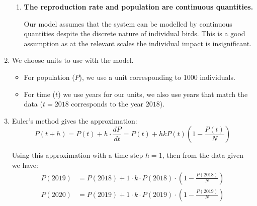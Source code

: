 \documentclass[a4paper, 11pt]{article}
\begin{document}
\begin{enumerate}[label=(\alph*)]
\begin{enumerate}[label=(\Roman*)]
    \item \textbf{The reproduction rate and population are continuous quantities.}
    
    Our model assumes that the system can be modelled by continuous quantities despite the discrete nature of individual birds. This is a good assumption as at the relevant scales the individual impact is insignificant. 
  \end{enumerate}

  \item We choose units to use with the model.
  \begin{itemize}
    \item For population ($P$), we use a unit corresponding to 1000 individuals.
    \item For time ($t$) we use years for our units, we also use years that match the data ($t=2018$ corresponds to the year $2018$). 
  \end{itemize}

  \item Euler's method gives the approximation:
  $$P(t+h)=P(t)+h\cdot\frac{dP}{dt}=P(t)+hkP(t)\left(1- \frac {P(t)}N \right)$$

  Using this approximation with a time step $h=1$, then from the data given we have: 
  \begin{align*}
    P(2019) &= P(2018)+1\cdot k\cdot P(2018)\cdot\left( 1  - \frac{P(2018)}{N} \right)\\
    P(2020) &= P(2019)+1\cdot k\cdot P(2019)\cdot\left( 1  - \frac{P(2019)}{N} \right)
  \end{align*} 


\end{enumerate}
\end{document}
